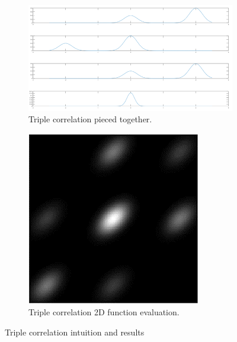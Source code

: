 \documentclass[a4paper]{article}
\begin{document}
\begin{figure}
     \centering
     \begin{subfigure}[b]{1.0\textwidth}
         \centering
         \includegraphics[width=\textwidth]{figures/triple_correlation.png}
         \caption{Triple correlation pieced together.}
         \label{fig:triple_correlation_explanation}
     \end{subfigure}
     \hfill
     \begin{subfigure}[b]{0.7\textwidth}
         \centering
         \includegraphics[width=\textwidth]{figures/triple_correlation_img.png}
         \caption{Triple correlation 2D function evaluation.}
         \label{fig:triple_correlation_img}
     \end{subfigure}
        \caption{Triple correlation intuition and results}
        \label{fig:triple_correlation}
\end{figure}
\end{document}
